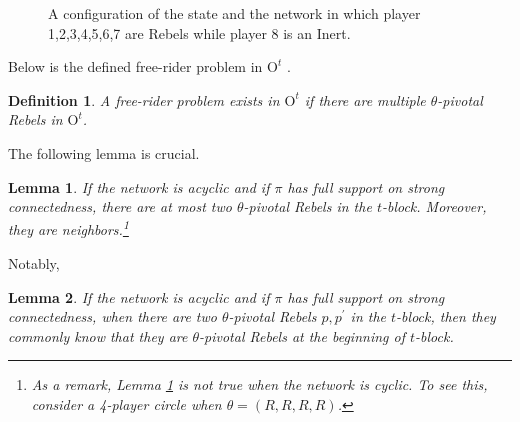 \documentclass[12pt,letter]{article}
\newcommand{\Omicron}{\mathrm{O}}
\newtheorem{lemma}{Lemma}[section]
\newtheorem{definition}{Definition}[section]
\theoremstyle{definition}
\theoremstyle{remark}
\theoremstyle{claim}
\begin{document}
\begin{figure}

\label{fig:k-1_pivotal}
\begin{center}
\end{center}
\caption{A configuration of the state and the network in which player 1,2,3,4,5,6,7 are Rebels while player 8 is an Inert.}
\end{figure}

Below is the defined free-rider problem in $\Omicron^t$ .

\begin{definition}
A free-rider problem exists in $\Omicron^t$ if there are multiple $\theta$-pivotal Rebels in $\Omicron^t$.
\end{definition}



The following lemma is crucial. 
\begin{lemma}
\label{lemma_at_most_two_nodes}
If the network is acyclic and if $\pi$ has full support on strong connectedness, there are at most two $\theta$-pivotal Rebels in the $t$-block. Moreover, they are neighbors.\footnote{As a remark, Lemma \ref{lemma_at_most_two_nodes} is not true when the network is cyclic. To see this, consider a 4-player circle when $\theta=(R,R,R,R)$.}
\end{lemma}

Notably,

\begin{lemma}
\label{lemman_pivotals_CK}
If the network is acyclic and if $\pi$ has full support on strong connectedness, when there are two $\theta$-pivotal Rebels $p,p^{'}$ in the $t$-block, then they commonly know that they are $\theta$-pivotal Rebels at the beginning of $t$-block.
\end{lemma}
\end{document}
